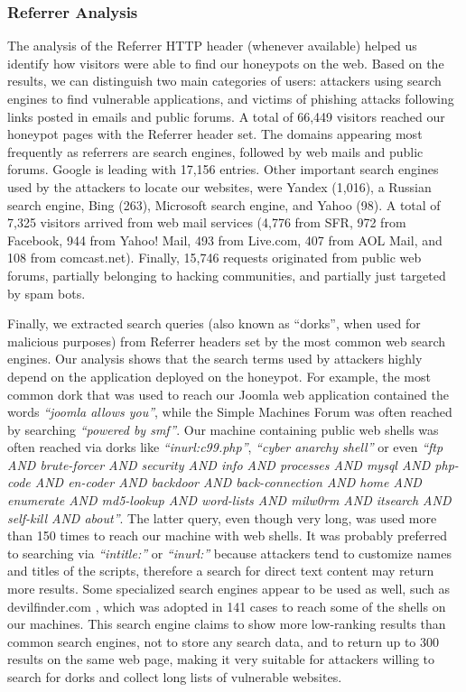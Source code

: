 \subsubsection{Referrer Analysis}

The analysis of the Referrer HTTP header (whenever available) helped us identify how visitors were able to find our honeypots on the web. Based on the results, we can distinguish two main categories of users: attackers using search engines to find vulnerable applications, and victims of phishing attacks following links posted in emails and public forums.
A total of 66,449 visitors reached our honeypot pages with the Referrer header set. The domains appearing most frequently as referrers are search engines, followed by web mails and public forums. Google is leading with 17,156 entries. Other important search engines used by the attackers to locate our websites, were Yandex (1,016), a Russian search engine, Bing (263), Microsoft search engine, and Yahoo (98). A total of 7,325 visitors arrived from web mail services (4,776 from SFR, 972 from Facebook, 944 from Yahoo! Mail, 493 from Live.com, 407 from AOL Mail, and 108 from comcast.net). Finally, 15,746 requests originated from public web forums, partially belonging to hacking communities, and partially just targeted by spam bots.

Finally, we extracted search queries (also known as ``dorks'', when used for malicious purposes) from Referrer headers set by the most common web search engines. Our analysis shows that the search terms used by attackers highly depend on the application deployed on the honeypot. For example, the most common dork that was used to reach our Joomla web application contained the words \emph{``joomla allows you''}, while the Simple Machines Forum was often reached by searching \emph{``powered by smf''}. Our machine containing public web shells was often reached via dorks like \emph{``inurl:c99.php''}, \emph{``cyber anarchy shell''} or even \emph{``ftp AND brute-forcer AND security AND info AND processes AND mysql AND php-code AND en-coder AND backdoor AND back-connection AND home AND enumerate AND md5-lookup AND word-lists AND milw0rm AND itsearch AND self-kill AND about''}. The latter query, even though very long, was used more than 150 times to reach our machine with web shells. It was probably preferred to searching via \emph{``intitle:''} or \emph{``inurl:''} because attackers tend to customize names and titles of the scripts, therefore a search for direct text content may return more results. Some specialized search engines appear to be used as well, such as devilfinder.com \cite{devilfinder}, which was adopted in 141 cases to reach some of the shells on our machines. This search engine claims to show more low-ranking results than common search engines, not to store any search data, and to return up to 300 results on the same web page, making it very suitable for attackers willing to search for dorks and collect long lists of vulnerable websites.


